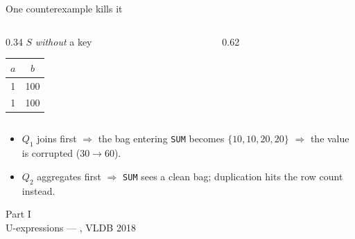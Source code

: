 \documentclass[9pt,aspectratio=169]{beamer}
\newcommand{\sectiontitle}[2]{%
  \begin{frame}[standout]
  #1\\[4pt]{\normalsize\normalfont\color{cGreyBg}#2}
  \end{frame}}
\begin{document}
\begin{frame}[fragile]{One counterexample kills it}
\begin{columns}[T]
\begin{column}{0.34\textwidth}
\centering
$S$ \emph{without} a key\\[2pt]
\begin{tabular}{@{}c|c@{}}\toprule $a$&$b$\\\midrule 1&100\\ \alert{1}&\alert{100}\\\bottomrule\end{tabular}
\end{column}
\begin{column}{0.62\textwidth}
\end{column}
\end{columns}
\vspace{4mm}
\begin{itemize}
\item<4-> $Q_1$ joins first $\Rightarrow$ the bag entering \texttt{SUM} becomes
      $\{10,10,20,20\}$ $\Rightarrow$ \alert{the value} is corrupted ($30\to60$).
\item<5-> $Q_2$ aggregates first $\Rightarrow$ \texttt{SUM} sees a clean bag; duplication hits
      \alert{the row count} instead.
\end{itemize}
\end{frame}

\sectiontitle{Part I}{U-expressions --- \udp{}, VLDB 2018}
\end{document}
